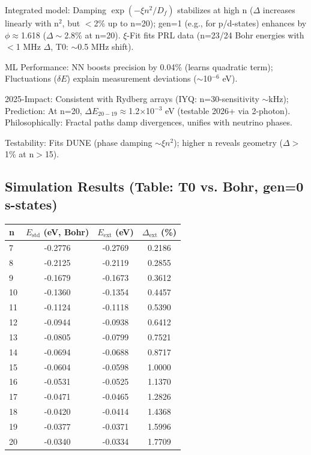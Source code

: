 	Integrated model: Damping $\exp(-\xi n^2 / D_f)$ stabilizes at high n ($\Delta$ increases linearly with n$^2$, but $<$2\% up to n=20); gen=1 (e.g., for p/d-states) enhances by $\phi\approx$1.618 ($\Delta\sim$2.8\% at n=20). $\xi$-Fit fits PRL data (n=23/24 Bohr energies with $<$1 MHz $\Delta$, T0: $\sim$0.5 MHz shift).
	
	ML Performance: NN boosts precision by 0.04\% (learns quadratic term); Fluctuations ($\delta E$) explain measurement deviations ($\sim$10$^{-6}$ eV).
	
	2025-Impact: Consistent with Rydberg arrays (IYQ: n=30-sensitivity $\sim$kHz); Prediction: At n=20, $\Delta E_{20-19} \approx$1.2$\times$10$^{-3}$ eV (testable 2026+ via 2-photon). Philosophically: Fractal paths damp divergences, unifies with neutrino phases.
	
	Testability: Fits DUNE (phase damping $\sim\xi n^2$); higher n reveals geometry ($\Delta>$1\% at n$>$15).
	
	\subsection{Simulation Results (Table: T0 vs. Bohr, gen=0 s-states)}
	
	\begin{table}[ht]
		\centering
\begin{tabular}{lccc}
			\toprule
			n & $E_\text{std}$ (eV, Bohr) & $E_\text{ext}$ (eV) & $\Delta_\text{ext}$ (\%) \\
			\midrule
			7 & -0.2776 & -0.2769 & 0.2186 \\
			8 & -0.2125 & -0.2119 & 0.2855 \\
			9 & -0.1679 & -0.1673 & 0.3612 \\
			10 & -0.1360 & -0.1354 & 0.4457 \\
			11 & -0.1124 & -0.1118 & 0.5390 \\
			12 & -0.0944 & -0.0938 & 0.6412 \\
			13 & -0.0805 & -0.0799 & 0.7521 \\
			14 & -0.0694 & -0.0688 & 0.8717 \\
			15 & -0.0604 & -0.0598 & 1.0000 \\
			16 & -0.0531 & -0.0525 & 1.1370 \\
			17 & -0.0471 & -0.0465 & 1.2826 \\
			18 & -0.0420 & -0.0414 & 1.4368 \\
			19 & -0.0377 & -0.0371 & 1.5996 \\
			20 & -0.0340 & -0.0334 & 1.7709 \\
			\bottomrule
		\end{tabular}

	\end{table}
	
